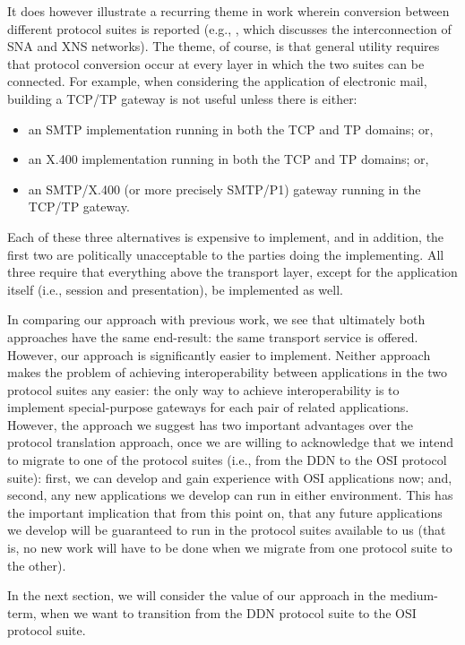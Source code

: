 It does however illustrate a recurring theme in work wherein conversion
between different protocol suites is reported
(e.g., \cite{SNA.convert.XNS},
which discusses the interconnection of SNA and XNS networks).
The theme, of course, is that general utility requires that
protocol conversion occur at every layer in which the two suites can be
connected.
For example,
when considering the application of electronic mail,
building a TCP/TP gateway is not useful unless there is either:
\begin{itemize}
\item	an SMTP implementation running in both the TCP and TP domains;
	or,
\item	an X.400 implementation running in both the TCP and TP domains;
	or,
\item	an SMTP/X.400 (or more precisely SMTP/P1\cite{MHS.P1}) gateway
	running in the TCP/TP gateway.
\end{itemize}
Each of these three alternatives is expensive to implement,
and in addition, the first two are politically unacceptable to the parties doing
the implementing.
All three require that everything above the transport layer,
except for the application itself (i.e., session and presentation),
be implemented as well.

In comparing our approach with previous work,
we see that ultimately both approaches have the same end-result:
the same transport service is offered.
However,
our approach is significantly easier to implement.
Neither approach makes the problem of achieving interoperability between
applications in the two protocol suites any easier:
the only way to achieve interoperability is to implement special-purpose
gateways for each pair of related applications.
However,
the approach we suggest has two important advantages over the protocol
translation approach, once we are willing to acknowledge that we intend to
migrate to one of the protocol suites (i.e., from the DDN to the OSI protocol
suite):
first, we can develop and gain experience with OSI applications now;
and, second,
any new applications we develop can run in either environment.
This has the important implication that from this point on,
that any future applications we develop will be guaranteed to run in the
protocol suites available to us
(that is, no new work will have to be done when we migrate from one protocol
suite to the other).

In the next section,
we will consider the value of our approach in the medium-term,
when we want to transition from the DDN protocol suite to the OSI protocol
suite.
